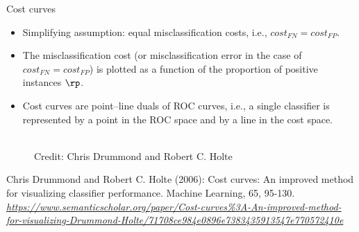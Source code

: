 \begin{vbframe}{Cost curves}
\begin{footnotesize}
\begin{itemize}
  \item Simplifying assumption: equal misclassification costs, i.e., $cost_{FN} = cost_{FP}$.
  \item The misclassification cost (or misclassification error in the case of $cost_{FN} = cost_{FP}$) is plotted as a function of the proportion of positive instances $\rp$.
  \item Cost curves are point–line duals of ROC curves, i.e., a single classifier is represented by a point in the ROC space and by a line in the cost space.
\end{itemize}
\end{footnotesize}
\vspace{-0.5  cm}
\begin{figure}
    \centering
    \tiny{\\ Credit: Chris Drummond and Robert C. Holte  \\}
\end{figure}
\vspace{-0.25cm}
{\tiny{Chris Drummond and Robert C. Holte (2006): Cost curves: An improved method for visualizing classifier performance. Machine Learning, 65, 95-130. \emph{\url{https://www.semanticscholar.org/paper/Cost-curves\%3A-An-improved-method-for-visualizing-Drummond-Holte/71708ce984e0896e7383435913547e770572410e}}}\par}

\end{vbframe}



